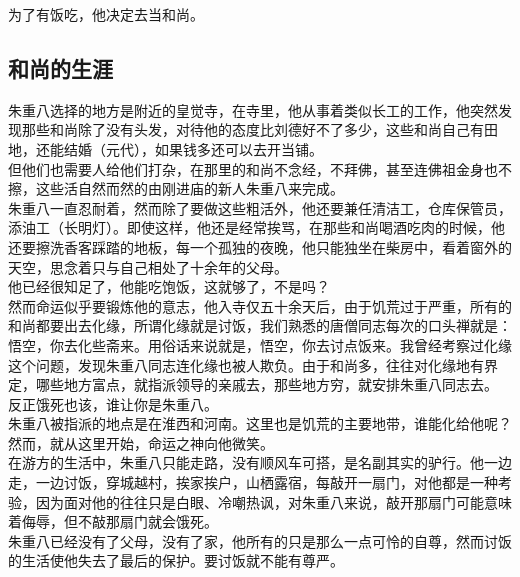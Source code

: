 \begin{multicols}{\theparacolNo}
为了有饭吃，他决定去当和尚。\\

\subsection{和尚的生涯}
朱重八选择的地方是附近的皇觉寺，在寺里，他从事着类似长工的工作，他突然发现那些和尚除了没有头发，对待他的态度比刘德好不了多少，这些和尚自己有田地，还能结婚（元代），如果钱多还可以去开当铺。\\

但他们也需要人给他们打杂，在那里的和尚不念经，不拜佛，甚至连佛祖金身也不擦，这些活自然而然的由刚进庙的新人朱重八来完成。\\

朱重八一直忍耐着，然而除了要做这些粗活外，他还要兼任清洁工，仓库保管员，添油工（长明灯）。即使这样，他还是经常挨骂，在那些和尚喝酒吃肉的时候，他还要擦洗香客踩踏的地板，每一个孤独的夜晚，他只能独坐在柴房中，看着窗外的天空，思念着只与自己相处了十余年的父母。\\

他已经很知足了，他能吃饱饭，这就够了，不是吗？\\

然而命运似乎要锻炼他的意志，他入寺仅五十余天后，由于饥荒过于严重，所有的和尚都要出去化缘，所谓化缘就是讨饭，我们熟悉的唐僧同志每次的口头禅就是：悟空，你去化些斋来。用俗话来说就是，悟空，你去讨点饭来。我曾经考察过化缘这个问题，发现朱重八同志连化缘也被人欺负。由于和尚多，往往对化缘地有界定，哪些地方富点，就指派领导的亲戚去，那些地方穷，就安排朱重八同志去。\\

反正饿死也该，谁让你是朱重八。\\

朱重八被指派的地点是在淮西和河南。这里也是饥荒的主要地带，谁能化给他呢？\\

然而，就从这里开始，命运之神向他微笑。\\

在游方的生活中，朱重八只能走路，没有顺风车可搭，是名副其实的驴行。他一边走，一边讨饭，穿城越村，挨家挨户，山栖露宿，每敲开一扇门，对他都是一种考验，因为面对他的往往只是白眼、冷嘲热讽，对朱重八来说，敲开那扇门可能意味着侮辱，但不敲那扇门就会饿死。\\

朱重八已经没有了父母，没有了家，他所有的只是那么一点可怜的自尊，然而讨饭的生活使他失去了最后的保护。要讨饭就不能有尊严。\\


\end{multicols}
